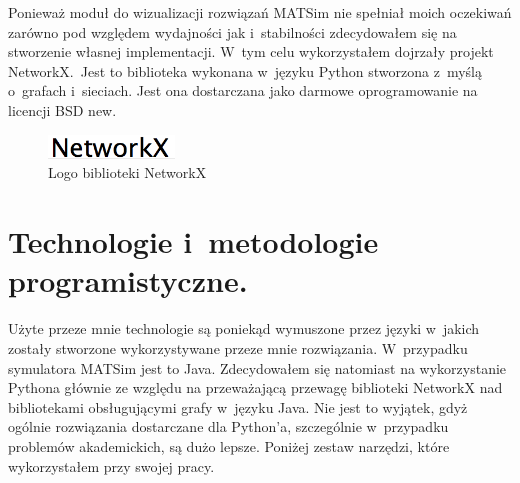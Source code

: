 \documentclass[twoside,12pt]{report}
\begin{document}
Ponieważ moduł do wizualizacji rozwiązań MATSim nie spełniał moich oczekiwań zarówno pod względem wydajności jak i~stabilności zdecydowałem się na stworzenie własnej implementacji. W~tym celu wykorzystałem dojrzały projekt NetworkX.~Jest to biblioteka wykonana w~języku Python stworzona z~myślą o~grafach i~sieciach. Jest ona dostarczana jako darmowe oprogramowanie na licencji BSD new\cite{networkx}. 

\begin{figure}[ht]
\centering
\includegraphics[width=0.30\textwidth]{img/networkx}
\caption{Logo biblioteki NetworkX} 
\end{figure}

\section{Technologie i~metodologie programistyczne.}

Użyte przeze mnie technologie są poniekąd wymuszone przez języki w~jakich zostały stworzone wykorzystywane przeze mnie rozwiązania. W~przypadku symulatora MATSim jest to Java. Zdecydowałem się natomiast na wykorzystanie Pythona głównie ze względu na przeważającą przewagę biblioteki NetworkX nad bibliotekami obsługującymi grafy w~języku Java. Nie jest to wyjątek, gdyż ogólnie rozwiązania dostarczane dla Python'a, szczególnie w~przypadku problemów akademickich, są dużo lepsze. Poniżej zestaw narzędzi, które wykorzystałem przy swojej pracy.  
\end{document}
